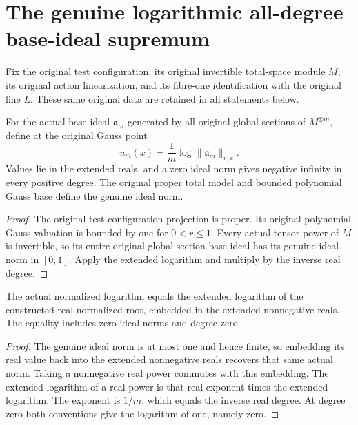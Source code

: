\section{The genuine logarithmic all-degree base-ideal supremum}

Fix the original test configuration, its original invertible total-space
module $M$, its original action linearization, and its fibre-one
identification with the original line $L$. These same original data
are retained in all statements below.

\begin{definition}\label{def:native-tc-original-normalized-log-ideal}
\leanok
For the actual base ideal $\mathfrak a_m$ generated by all original
global sections of $M^{\otimes m}$, define at the original Gauss point
\[
 u_m(x)=\frac1m\log\lVert\mathfrak a_m\rVert_{r,x}.
\]
Values lie in the extended reals, and a zero ideal norm gives negative
infinity in every positive degree. The original proper total model
and bounded polynomial Gauss base define the genuine ideal norm.
\end{definition}
\begin{proof}
The original test-configuration projection is proper. Its original
polynomial Gauss valuation is bounded by one for $0<r\leq1$.
Every actual tensor power of $M$ is invertible, so its entire original
global-section base ideal has its genuine ideal norm in $[0,1]$.
Apply the extended logarithm and multiply by the inverse real degree.
\end{proof}

\begin{lemma}\label{lem:native-tc-original-log-root-identity}
\leanok
The actual normalized logarithm equals the extended logarithm of the
constructed real normalized root, embedded in the extended
nonnegative reals. The equality includes zero ideal norms and degree zero.
\end{lemma}
\begin{proof}
The genuine ideal norm is at most one and hence finite, so embedding
its real value back into the extended nonnegative reals recovers
that same actual norm. Taking a nonnegative real power commutes with
this embedding. The extended logarithm of a real power is that real
exponent times the extended logarithm. The exponent is $1/m$, which
equals the inverse real degree. At degree zero both conventions give
the logarithm of one, namely zero.
\end{proof}

